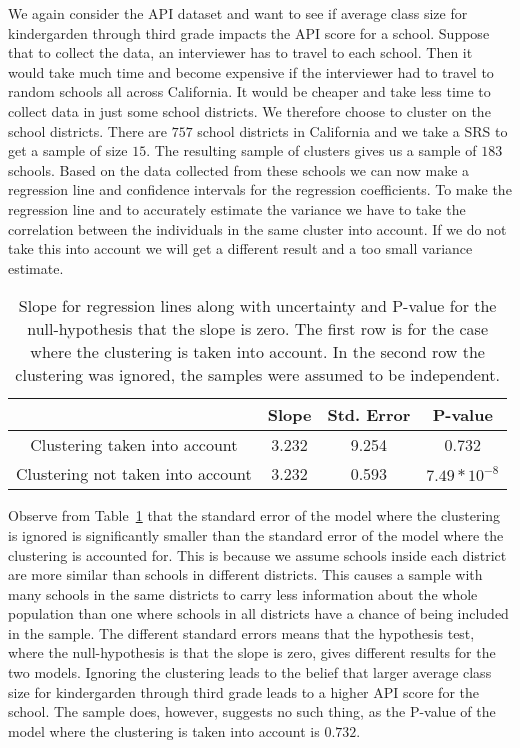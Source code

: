 \documentclass{article}
\begin{document}
\begin{example}
  We again consider the API dataset and want to see if average class size for
  kindergarden through third grade
  impacts the API score for a school. Suppose that to collect the data, an
  interviewer has to travel to each school. Then it would take much time and
  become expensive if the interviewer had to travel to random schools all across
  California. It would be cheaper and take less time to
  collect data in just some school districts. We therefore choose to cluster
  on the school districts. There are \(757\) school districts in California and we take a SRS to
  get a sample of size \(15\). The resulting sample of clusters gives us a sample of \(183\) schools. Based on
  the data collected from these schools we can now make a regression line and
  confidence intervals for the regression coefficients.
  To make the regression line and to accurately estimate the variance we have to
  take the correlation between the individuals in the same cluster into account.
  If we do not take this into account we will get a different result and a too
  small variance estimate.

  \begin{table}
    \centering
    \begin{tabular}{c|ccc}
     & Slope & Std. Error & P-value \\ 
      \hline
      Clustering taken into account & 3.232 & 9.254 & 0.732 \\
      Clustering not taken into account & 3.232 & 0.593 & \(7.49 * 10^{-8}\) \\
    \end{tabular}
    \caption{Slope for regression lines along with uncertainty and P-value for
      the null-hypothesis that the slope is zero. The first row is for the case
      where the clustering is taken into account. In the second row the
      clustering was ignored, the samples were assumed to be independent.}
    \label{tab:exClust}
  \end{table}

  Observe from Table~\ref{tab:exClust} that the standard error of the model where
  the clustering is ignored is significantly smaller than the standard error of
  the model where the clustering is accounted for. This is because we assume
  schools inside each district are more similar than schools in different
  districts. This causes a sample with many schools in the same districts to
  carry less information about the whole population than one where schools in
  all districts have a chance of being included in the sample. The different
  standard errors means that the hypothesis
  test, where the null-hypothesis is that the slope is zero, gives different
  results for the two models. Ignoring the clustering leads to the belief that larger average
  class size for kindergarden through third grade leads to a higher API score
  for the school. The sample does, however, suggests no such thing, as the P-value
  of the model where the clustering is taken into account is \(0.732\).
\end{example}
\end{document}
